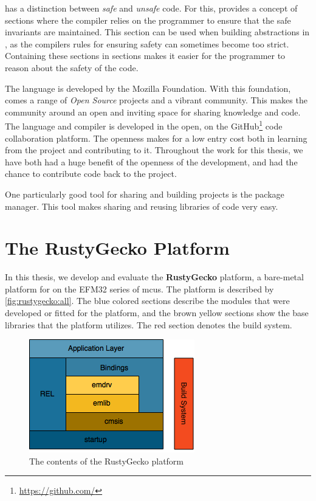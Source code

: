 {\rust} has a distinction between \emph{safe} and \emph{unsafe} code.
For this, {\rust} provides a concept of {\unsafe} sections where the compiler relies on the programmer to ensure that the safe invariants are maintained.
This section can be used when building abstractions in {\rust}, as the compilers rules for ensuring safety can sometimes become too strict.
Containing these sections in {\unsafe} sections makes it easier for the programmer to reason about the safety of the code.

The {\rust} language is developed by the Mozilla Foundation.
With this foundation, comes a range of \emph{Open Source} projects and a vibrant community.
This makes the community around {\rust} an open and inviting space for sharing knowledge and code.
The {\rust} language and compiler is developed in the open, on the GitHub\footnote{\url{https://github.com/}} code collaboration platform.
The openness makes for a low entry cost both in learning from the project and contributing to it.
Throughout the work for this thesis, we have both had a huge benefit of the openness of the development, and had the chance to contribute code back to the {\rust} project.

One particularly good tool for sharing and building {\rust} projects is the {\cargo} package manager.
This tool makes sharing and reusing libraries of code very easy.

\section{The RustyGecko Platform}

In this thesis, we develop and evaluate the \textbf{RustyGecko} platform, a bare-metal platform for {\rust} on the EFM32 series of \glspl{mcu}.
The platform is described by \autoref{fig:rustygecko:all}.
The blue colored sections describe the {\rust} modules that were developed or fitted for the platform, and the brown yellow sections show the base {\C} libraries that the platform utilizes.
The red section denotes the build system.

\begin{figure}[H]
  \begin{center}
    \includegraphics{figures/RustyGecko-all.png}
  \end{center}
  \caption{The contents of the RustyGecko platform}
  \label{fig:rustygecko:all}
\end{figure}

